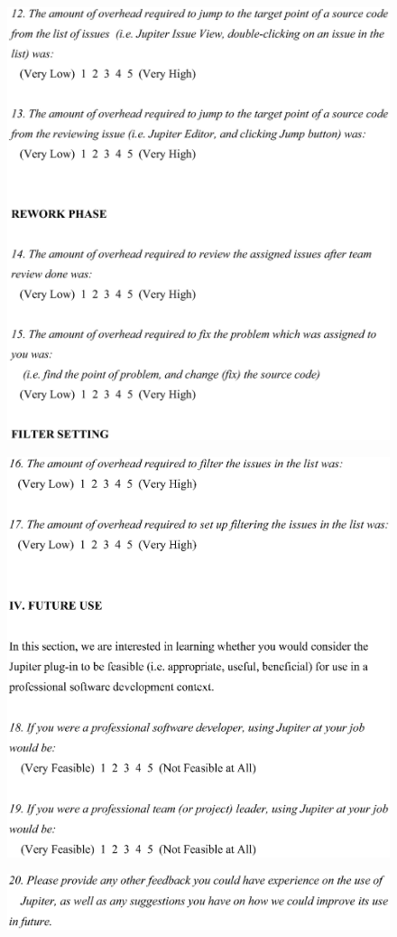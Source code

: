 \begin{figure}[htbp]
  \centering
  \includegraphics[width=1.0\textwidth]{figures/JupiterQuestionnaire_8.eps}
  \label{fig:JupiterQuestionnaire_8}
\end{figure}

\begin{figure}[htbp]
  \centering
  \includegraphics[width=1.0\textwidth]{figures/JupiterQuestionnaire_9.eps}
  \label{fig:JupiterQuestionnaire_9}
\end{figure}

\begin{figure}[htbp]
  \centering
  \includegraphics[width=1.0\textwidth]{figures/JupiterQuestionnaire_10.eps}
  \label{fig:JupiterQuestionnaire_10}
\end{figure}
